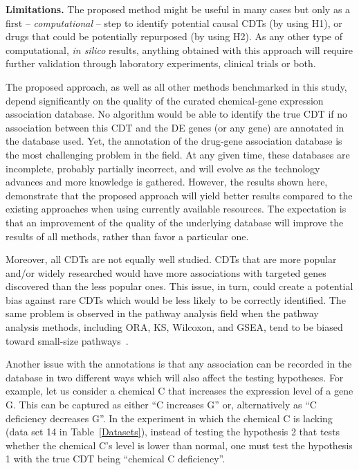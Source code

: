 \documentclass[Minh_PhD_thesis.tex]{subfiles}
\begin{document}
\textbf{Limitations.}
The proposed method might be useful in many cases but only as a first -- \emph{computational} -- step to identify potential  causal CDTs (by using  H1), or drugs that could be potentially repurposed (by using H2). As any other type of computational, \textit{in silico} results, anything obtained with this approach will require further validation through laboratory experiments, clinical trials or both.

The proposed approach, as well as all other methods benchmarked in this study, depend significantly on the quality of the curated chemical-gene expression association database.
No algorithm would be able to identify the true CDT if no association between this CDT and the DE genes (or any gene) are annotated in the database used.
Yet, the annotation of the drug-gene association database is the most challenging problem in the field. 
At any given time, these databases are incomplete, probably partially incorrect, and will evolve as the technology advances and more knowledge is gathered. However, the results shown here, demonstrate that the proposed approach will yield better results compared to the existing approaches when using currently available resources. The expectation is that an improvement of the quality of the underlying database will improve the results of all methods, rather than favor a particular one. 

Moreover, all CDTs are not equally well studied. CDTs that are more popular and/or widely researched would have more associations with targeted genes discovered than the less popular ones.
This issue, in turn, could create a potential bias against rare CDTs which would be less likely to be correctly identified.
The same problem is observed in the pathway analysis field when the pathway analysis methods, including ORA, KS, Wilcoxon, and GSEA, tend to be biased toward small-size pathways~\cite{nguyen2019identifying}.

Another issue with the annotations is that any association can be recorded in the database in two different ways which will also affect the testing hypotheses.
For example, let us consider a chemical C that increases  the   expression level of a gene G. This can be captured as either ``C increases G'' or, alternatively as ``C deficiency decreases G''. 
In the experiment in which the chemical C is lacking (data set 14 in Table~\ref{Datasets}), instead of testing the hypothesis 2 that tests whether the chemical C's level is lower than normal, one must test the hypothesis 1 with the true CDT being ``chemical C deficiency''.
\end{document}

